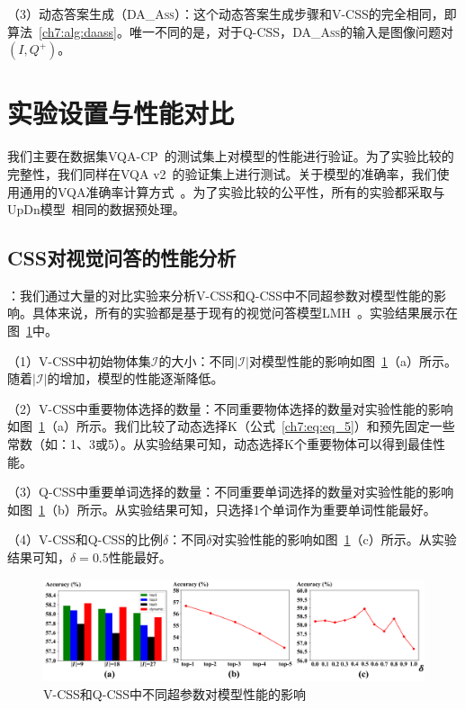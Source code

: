 （3）动态答案生成（\textsc{DA\_Ass}）：这个动态答案生成步骤和V-CSS的完全相同，即算法~\ref{ch7:alg:daass}。唯一不同的是，对于Q-CSS，\textsc{DA\_Ass}的输入是图像问题对$(I, Q^+)$。


\section{实验设置与性能对比}

我们主要在数据集VQA-CP~\cite{agrawal2018don}的测试集上对模型的性能进行验证。为了实验比较的完整性，我们同样在VQA v2~\cite{goyal2017making}的验证集上进行测试。关于模型的准确率，我们使用通用的VQA准确率计算方式~\cite{antol2015vqa}。为了实验比较的公平性，所有的实验都采取与UpDn模型~\cite{anderson2018bottom}相同的数据预处理。

\subsection{CSS对视觉问答的性能分析}

\textbf{}：我们通过大量的对比实验来分析V-CSS和Q-CSS中不同超参数对模型性能的影响。具体来说，所有的实验都是基于现有的视觉问答模型LMH~\cite{clark2019don}。实验结果展示在图~\ref{ch7:fig:ablative_studies}中。

（1）V-CSS中初始物体集$\mathcal{I}$的大小：不同$|\mathcal{I}|$对模型性能的影响如图~\ref{ch7:fig:ablative_studies}（a）所示。随着$|\mathcal{I}|$的增加，模型的性能逐渐降低。

（2）V-CSS中重要物体选择的数量：不同重要物体选择的数量对实验性能的影响如图~\ref{ch7:fig:ablative_studies}（a）所示。我们比较了动态选择K（公式~\ref{ch7:eq:eq_5}）和预先固定一些常数（如：1、3或5）。从实验结果可知，动态选择K个重要物体可以得到最佳性能。

（3）Q-CSS中重要单词选择的数量：不同重要单词选择的数量对实验性能的影响如图~\ref{ch7:fig:ablative_studies}（b）所示。从实验结果可知，只选择1个单词作为重要单词性能最好。

（4）V-CSS和Q-CSS的比例$\delta$：不同$\delta$对实验性能的影响如图~\ref{ch7:fig:ablative_studies}（c）所示。从实验结果可知，$\delta = 0.5$性能最好。


\begin{figure}[t]
    \centering
    \includegraphics[width=\linewidth]{chapter7/res/ablative_studies.pdf}
    \caption{V-CSS和Q-CSS中不同超参数对模型性能的影响}
    \label{ch7:fig:ablative_studies}
\end{figure}


